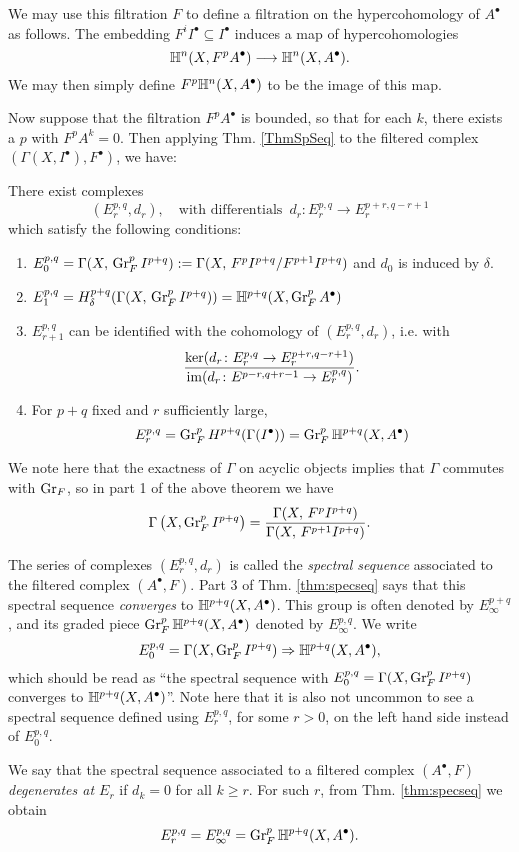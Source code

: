 \documentclass[../main.tex]{subfiles}
\begin{document}
We may use this filtration $F$ to define a filtration on the hypercohomology of $A^\bullet$ as follows. The embedding $F^iI^{\bullet}\subseteq I^{\bullet}$ induces a map of hypercohomologies
\[\mathbb{H}^n(X,F^pA^\bullet)\longrightarrow\mathbb{H}^n(X,A^\bullet).\]
We may then simply define $F^p\mathbb{H}^n(X,A^\bullet)$ to be the image of this map.

Now suppose that the filtration $F^pA^{\bullet}$ is bounded, so that for each $k$, there exists a $p$ with $F^pA^k = 0$. Then
applying Thm. \ref{ThmSpSeq} to the filtered complex $(\Gamma(X,I^\bullet),F^\bullet)$, we have:

\begin{theorem}\label{thm:specseq} \textup{\cite[Thm. 8.21]{Voi07}}   There exist complexes 
\[(E^{p,q}_r,d_r), \quad \mbox{with differentials } \, d_r\colon E^{p,q}_r \rightarrow E^{p+r,q-r+1}_r\]
which satisfy the following conditions:
\begin{enumerate}
\item $E_0^{p,q} = \Gamma(X,\,\operatorname{Gr}_F^p I^{p+q}) := \Gamma(X,\,F^p I^{p+q}/F^{p+1} I^{p+q})$ and $d_0$ is induced by $\delta$.
\item $E_1^{p,q} = H^{p+q}_\delta(\Gamma(X,\,\operatorname{Gr}_F^p I^{p+q})) = \mathbb{H}^{p+q}(X,\operatorname{Gr}_F^p A^\bullet)$
\item $E^{p,q}_{r+1}$ can be identified with the cohomology of $(E_r^{p,q},d_r)$, i.e. with
\[\frac{\mathrm{ker}(d_r\colon E^{p,q}_r \to E^{p+r,q-r+1}_r)}{\operatorname{im}(d_r\colon E^{p-r,q+r-1} \to E^{p,q}_r)}.\]
\item For $p + q$ fixed and $r$ sufficiently large,
\[E^{p,q}_r = \operatorname{Gr}_F^p H^{p+q}(\Gamma (I^\bullet)) = \operatorname{Gr}_F^p \mathbb{H}^{p+q}(X,A^\bullet)\]
\end{enumerate}
\end{theorem}

We note here that the exactness of $\Gamma$ on acyclic objects implies that $\Gamma$ commutes with $\operatorname{Gr}_F$, so in part 1 of the above theorem we have
\[\Gamma\left(X,\operatorname{Gr}_F^p I^{p+q}\right) = \frac{\Gamma(X,\,F^p I^{p+q})}{\Gamma(X,\,F^{p+1} I^{p+q})}.\]

The series of complexes $(E^{p,q}_r,d_r)$ is called the \emph{spectral sequence} associated to the filtered complex $(A^{\bullet},F)$. Part 3 of Thm. \ref{thm:specseq} says that this spectral sequence \emph{converges} to $\mathbb{H}^{p+q}(X,A^\bullet)$. This group is often denoted by $E^{p+q}_{\infty}$, and its graded piece $\operatorname{Gr}_F^p \mathbb{H}^{p+q}(X,A^\bullet)$ denoted by $E^{p,q}_{\infty}$. We write
\[ E_0^{p,q}=\Gamma(X,\operatorname{Gr}_F^p I^{p+q}) \Rightarrow \mathbb{H}^{p+q}(X,A^\bullet),\]
which should be read as ``the spectral sequence with $E_0^{p,q}=\Gamma(X,\operatorname{Gr}_F^p I^{p+q})$ converges to $ \mathbb{H}^{p+q}(X,A^\bullet)$''. Note here that it is also not uncommon to see a spectral sequence defined using $E_r^{p,q}$, for some $r>0$, on the left hand side instead of $E_0^{p,q}$.

We say that the spectral sequence associated to a filtered complex $(A^\bullet, F)$ \emph{degenerates at $E_r$} if $d_k = 0$ for all $k \geq r$. For such $r$, from Thm. \ref{thm:specseq} we obtain 
\[ E_r^{p,q} = E_\infty^{p,q} = \operatorname{Gr}_F^p \mathbb{H}^{p+q}(X,A^\bullet).\]
\end{document}
